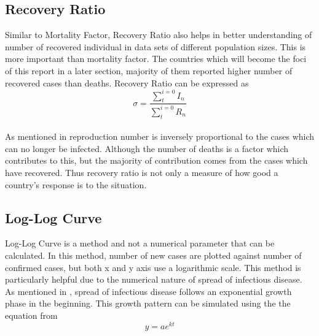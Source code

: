\documentclass[12pt, twosided]{report}  %
\begin{document}
\subsection*{Recovery Ratio}
Similar to Mortality Factor, Recovery Ratio also helps in better understanding of number of recovered individual in data sets of different population sizes. This is more important than mortality factor. The countries which will become the foci of this report in a later section, majority of them reported higher number of recovered cases than deaths. Recovery Ratio can be expressed as
$$\sigma=\frac{\sum^{i=0}_{t} I_n}{\sum^{i=0}_{t} R_n}$$
\\
As mentioned in \cite{kermack1927contribution} reproduction number is inversely proportional to the cases which can no longer be infected. Although the number of deaths is a factor which  contributes to this, but the majority of contribution comes from the cases which have recovered. Thus recovery ratio is not only a measure of how good a country's response is to the situation.
\subsection*{Log-Log Curve}
Log-Log Curve is a method and not a numerical parameter that can be calculated. In this method, number of new cases are plotted against number of confirmed cases, but both x and y axis use a logarithmic scale. This method is particularly helpful due to the numerical nature of spread of infectious disease. As mentioned in \cite{chowell2016growing}, spread of infectious disease follows an exponential growth phase in the beginning. This growth pattern can be simulated using the the equation from \cite{Abramson2015}
$$y=ae^{kt}$$

\end{document}
